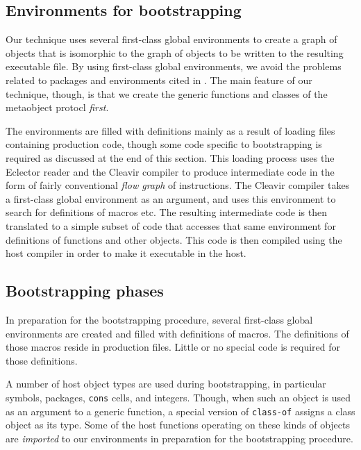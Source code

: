 \subsection{Environments for bootstrapping}

Our technique uses several first-class global environments
\cite{Strandh:2015:ELS:Environments} to create a graph of objects that
is isomorphic to the graph of objects to be written to the resulting
executable file.  By using first-class global environments, we avoid
the problems related to packages and environments cited in
.  The main feature of our technique, though, is
that we create the generic functions and classes of the metaobject
protocl \emph{first}.

The environments are filled with definitions mainly as a result of
loading files containing production \sicl{} code, though some code
specific to bootstrapping is required as discussed at the end of this
section.  This loading process uses the Eclector reader and the
Cleavir compiler to produce intermediate code in the form of fairly
conventional \emph{flow graph} of instructions.  The Cleavir compiler
takes a first-class global environment as an argument, and uses this
environment to search for definitions of macros etc.  The resulting
intermediate code is then translated to a simple subset of
\commonlisp{} code that accesses that same environment for definitions
of functions and other objects.  This \commonlisp{} code is then
compiled using the host compiler in order to make it executable in the
host.

\subsection{Bootstrapping phases}

In preparation for the bootstrapping procedure, several first-class
global environments are created and filled with definitions of \sicl{}
macros.  The definitions of those macros reside in production \sicl{}
files.  Little or no special code is required for those definitions.

A number of host object types are used during bootstrapping, in
particular symbols, packages, \texttt{cons} cells, and integers.
Though, when such an object is used as an argument to a \sicl{}
generic function, a special version of \texttt{class-of} assigns a
\sicl{} class object as its type.  Some of the host functions
operating on these kinds of objects are \emph{imported} to our
environments in preparation for the bootstrapping procedure.

